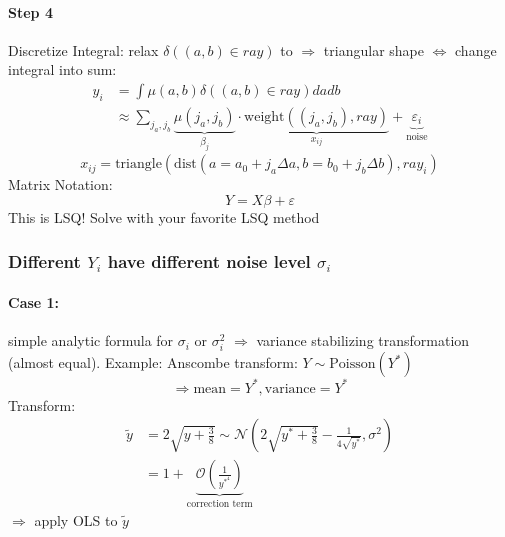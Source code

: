 \documentclass[11pt]{article}
\begin{document}
\begin{itemize}
      \paragraph{Step 4} Discretize Integral: relax $\delta((a,b) \in ray)$ to
      $\Rightarrow$ triangular shape $\iff$ change integral into sum:
      \begin{equation*}
        \begin{align*}
        y_i &= \int \mu(a,b) \delta((a,b) \in ray) da db \\
        &\approx \sum_{j_a, j_b} \underbrace{\mu(j_a, j_b)}_{\beta_j} \cdot
        \underbrace{\text{weight}((j_a, j_b), ray)}_{x_{ij}} +
        \underbrace{\varepsilon_i}_{\text{noise}}
        \end{align*}
      \end{equation*}
      \begin{equation*}
        x_{ij} = \text{triangle} (\text{dist}(a=a_0+j_a \Delta a, b= b_0+j_b \Delta b), ray_i)
      \end{equation*}
      Matrix Notation:
      \begin{equation*}
        Y = X\beta + \varepsilon
      \end{equation*}
      This is LSQ! Solve with your favorite LSQ method
      \subsubsection{Different $Y_i$ have different noise level $\sigma_i$}
      \paragraph{Case 1:} simple analytic formula for $\sigma_i$ or $\sigma_i^2$
      $\Rightarrow$ variance stabilizing transformation (almost equal).
      Example: Anscombe transform: $Y \sim \text{Poisson}(Y^*)$
      \begin{equation*}
        \Rightarrow \text{mean} = Y^*, \text{variance} = Y^*
      \end{equation*}
      Transform:
      \begin{equation*}
        \begin{align*}
        \tilde{y} &= 2\sqrt{y+\frac{3}{8}} \sim \mathcal{N}(2
        \sqrt{y^*+\frac{3}{8}}-\frac{1}{4\sqrt{y^*}}, \sigma^2) \\
        &=1+\underbrace{\mathcal{O}\left(\frac{1}{y^*^4}\right)}_{\text{correction term}}
        \end{align*}
      \end{equation*}
      $\Rightarrow$ apply OLS to $\tilde{y}$ \\

\end{itemize}
\end{document}
